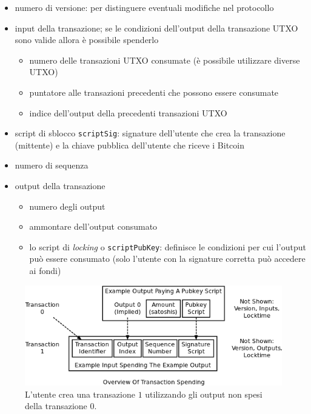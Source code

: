 \begin{itemize}
    \item numero di versione: per distinguere eventuali modifiche nel protocollo
    \item input della transazione; se le condizioni dell'output della transazione UTXO sono valide allora è possibile spenderlo
        \begin{itemize}
            \item numero delle transazioni UTXO consumate (è possibile utilizzare diverse UTXO)
            \item puntatore alle transazioni precedenti che possono essere consumate
            \item indice dell'output della precedenti transazioni UTXO
        \end{itemize}
    \item script di sblocco \texttt{scriptSig}: signature dell'utente che crea la transazione (mittente) e la chiave pubblica dell'utente che riceve i Bitcoin
    \item numero di sequenza
    \item output della transazione
        \begin{itemize}
            \item numero degli output
            \item ammontare dell'output consumato
            \item lo script di \textit{locking} o \texttt{scriptPubKey}: definisce le condizioni per cui l'output può essere consumato (solo l'utente con la signature corretta può accedere ai fondi)
        \end{itemize}
\end{itemize}
\begin{figure}
    \centering
    \includegraphics[width=\textwidth]{./images/example-tx.png}
    \caption{L'utente crea una transazione $1$ utilizzando gli output non spesi della transazione $0$.}
\end{figure}
